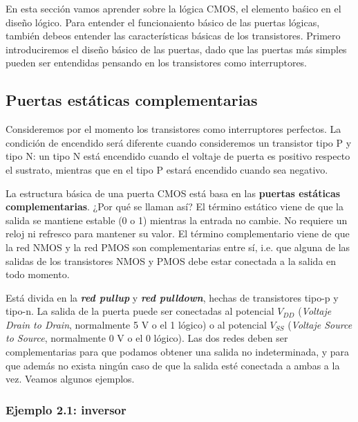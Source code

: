 En esta sección vamos aprender sobre la lógica CMOS, el elemento baśico en el diseño lógico. Para entender el funcionaiento básico de las puertas lógicas, también debeos entender las características básicas de los transistores. Primero introduciremos el diseño básico de las puertas, dado que las puertas más simples pueden ser entendidas pensando en los transistores como interruptores. 

\subsection{Puertas estáticas complementarias}

Consideremos por el momento los transistores como interruptores perfectos. La condición de encendido será diferente cuando consideremos un transistor tipo P y tipo N: un tipo N está encendido cuando el voltaje de puerta es positivo respecto el sustrato, mientras que en el tipo P estará encendido cuando sea negativo. 

La estructura básica de una puerta CMOS está basa en las \textbf{puertas estáticas complementarias}. ¿Por qué se llaman así? El término estático viene de que la salida se mantiene estable (0 o 1) mientras la entrada no cambie. No requiere un reloj ni refresco para mantener su valor. El término complementario viene de que la red NMOS y la red PMOS son complementarias entre sí, i.e. que alguna de las salidas de los transistores NMOS y PMOS debe estar conectada a la salida en todo momento. 

Está divida en la \textbf{\textit{red pullup}} y \textbf{\textit{red pulldown}}, hechas de transistores tipo-p y tipo-n. La salida de la puerta puede ser conectadas al potencial $V_{DD}$ (\textit{Voltaje Drain to Drain}, normalmente 5 V o el 1 lógico) o al potencial $V_{SS}$ (\textit{Voltaje Source to Source}, normalmente 0 V o el 0 lógico). Las dos redes deben ser complementarias para que podamos obtener una salida no indeterminada, y para que además no exista ningún caso de que la salida esté conectada a ambas a la vez. Veamos algunos ejemplos. 

\begin{Ejemplo}
    \subsubsection*{Ejemplo 2.1: inversor}
\end{Ejemplo}

